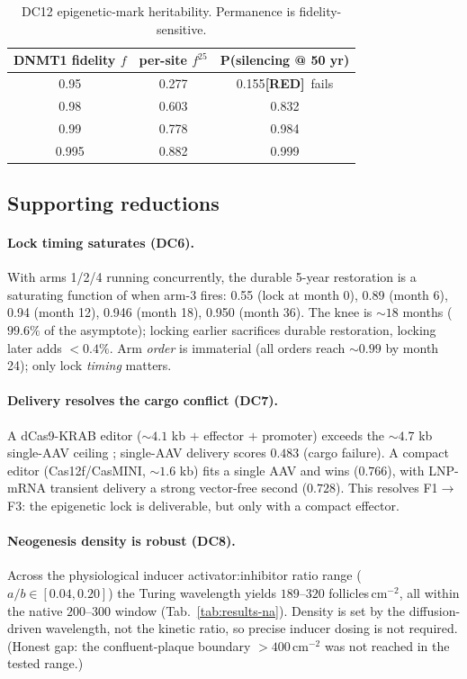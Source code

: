 \documentclass[11pt,a4paper]{article}
\newcommand{\tierbadge}[2]{\textcolor{#1}{\textbf{[#2]}}}
\providecommand{\tierRed}{\tierbadge{red!75!black}{RED}}
\begin{document}
\begin{table}[h]
\centering\small
\begin{tabular}{ccc}
\toprule
\textbf{DNMT1 fidelity $f$} & \textbf{per-site $f^{25}$} & \textbf{P(silencing @ 50 yr)} \\
\midrule
0.95 & 0.277 & 0.155\quad\tierRed\ fails \\
0.98 & 0.603 & 0.832 \\
0.99 & 0.778 & 0.984 \\
0.995& 0.882 & 0.999 \\
\bottomrule
\end{tabular}
\caption{DC12 epigenetic-mark heritability. Permanence is fidelity-sensitive.}
\label{tab:dc12}
\end{table}

\subsection{Supporting reductions}

\paragraph{Lock timing saturates (DC6).} With arms 1/2/4 running concurrently, the
durable 5-year restoration is a saturating function of when arm-3 fires: 0.55
(lock at month 0), 0.89 (month 6), 0.94 (month 12), 0.946 (month 18), 0.950
(month 36). The knee is ${\sim}18$ months ($99.6\%$ of the asymptote); locking
earlier sacrifices durable restoration, locking later adds $<0.4\%$. Arm
\emph{order} is immaterial (all orders reach ${\sim}0.99$ by month 24); only lock
\emph{timing} matters.

\paragraph{Delivery resolves the cargo conflict (DC7).} A dCas9-KRAB editor
(${\sim}4.1$ kb $+$ effector $+$ promoter) exceeds the ${\sim}4.7$ kb single-AAV
ceiling \citep{wu2010}; single-AAV delivery scores $0.483$ (cargo failure). A
compact editor (Cas12f/CasMINI, ${\sim}1.6$ kb) fits a single AAV and wins
($0.766$), with LNP-mRNA transient delivery a strong vector-free second ($0.728$).
This resolves F1$\to$F3: the epigenetic lock is deliverable, but only with a compact
effector.

\paragraph{Neogenesis density is robust (DC8).} Across the physiological inducer
activator:inhibitor ratio range ($a/b\in[0.04,0.20]$) the Turing wavelength yields
$189$--$320$ follicles\,cm$^{-2}$, all within the native $200$--$300$ window
(Tab.~\ref{tab:results-na}). Density is set by the diffusion-driven wavelength, not
the kinetic ratio, so precise inducer dosing is not required. (Honest gap: the
confluent-plaque boundary $>400$\,cm$^{-2}$ was not reached in the tested range.)
\end{document}
